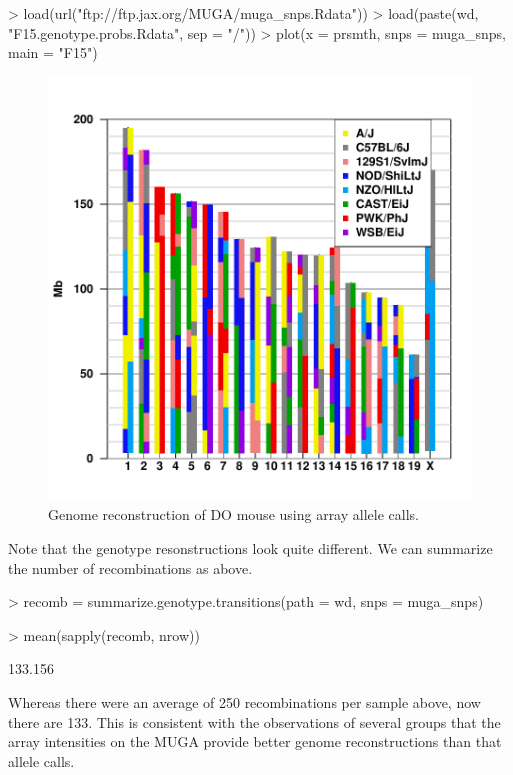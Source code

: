 \documentclass{article}
\begin{document}
\begin{Schunk}
\begin{Sinput}
> load(url("ftp://ftp.jax.org/MUGA/muga_snps.Rdata"))
> load(paste(wd, "F15.genotype.probs.Rdata", sep = "/"))
> plot(x = prsmth, snps = muga_snps, main = "F15")
\end{Sinput}
\end{Schunk}

\begin{figure}
\begin{center}
\includegraphics{Genotyping_DO_Mice-fig3}
\end{center}
\caption{Genome reconstruction of DO mouse using array allele calls. }
\label{fig:allele_genoplot}
\end{figure}

Note that the genotype resonstructions look quite different. We can summarize the number of recombinations as above.

\begin{Schunk}
\begin{Sinput}
> recomb = summarize.genotype.transitions(path = wd, snps = muga_snps)
\end{Sinput}
\end{Schunk}

\begin{Schunk}
\begin{Sinput}
> mean(sapply(recomb, nrow))
\end{Sinput}
\begin{Soutput}
[1] 133.156
\end{Soutput}
\end{Schunk}

Whereas there were an average of 250 recombinations per sample above, now there are 133. This is consistent with the observations of several groups that the array intensities on the MUGA provide better genome reconstructions than that allele calls.
\end{document}
